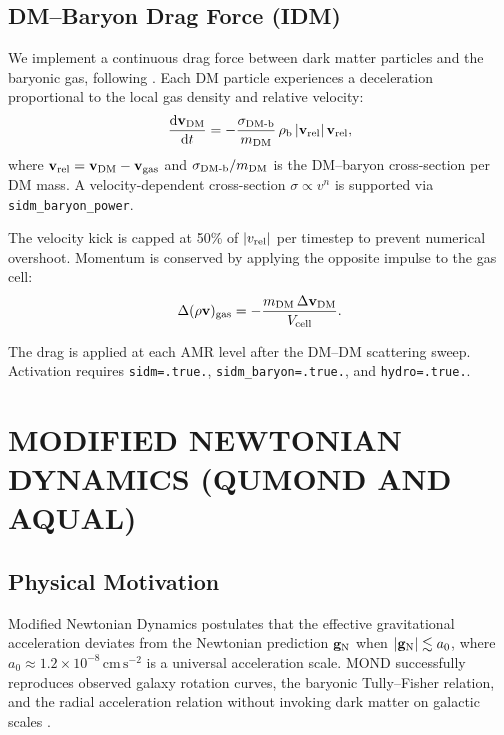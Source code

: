 \documentclass[fleqn,usenatbib]{mnras}
\newcommand{\code}[1]{\texttt{#1}}
\newcommand{\vrel}{v_{\rm rel}}
\newcommand{\azero}{a_0}
\newcommand{\gN}{\mathbf{g}_{\rm N}}
\begin{document}
\subsection{DM--Baryon Drag Force (IDM)}
\label{sec:sidm_baryon}

We implement a continuous drag force between dark matter particles and
the baryonic gas, following \citet{Nguyen2025}.  Each DM particle
experiences a deceleration proportional to the local gas density and
relative velocity:
\begin{equation}
\frac{\mathrm{d}\mathbf{v}_{\rm DM}}{\mathrm{d}t}
= -\frac{\sigma_{\rm DM\text{-}b}}{m_{\rm DM}}
  \,\rho_{\rm b}\,|\mathbf{v}_{\rm rel}|\,\mathbf{v}_{\rm rel},
\label{eq:idm_drag}
\end{equation}
where $\mathbf{v}_{\rm rel} = \mathbf{v}_{\rm DM} -
\mathbf{v}_{\rm gas}$ and $\sigma_{\rm DM\text{-}b}/m_{\rm DM}$ is
the DM--baryon cross-section per DM mass.  A velocity-dependent
cross-section $\sigma \propto v^n$ is supported via
\code{sidm\_baryon\_power}.

The velocity kick is capped at 50\% of $|\vrel|$ per timestep to
prevent numerical overshoot.  Momentum is conserved by applying the
opposite impulse to the gas cell:
\begin{equation}
\Delta(\rho\mathbf{v})_{\rm gas}
= -\frac{m_{\rm DM}\,\Delta\mathbf{v}_{\rm DM}}{V_{\rm cell}}.
\end{equation}

The drag is applied at each AMR level after the DM--DM scattering
sweep.  Activation requires \code{sidm=.true.},
\code{sidm\_baryon=.true.}, and \code{hydro=.true.}.

\section{MODIFIED NEWTONIAN DYNAMICS (QUMOND AND AQUAL)}
\label{sec:mond}

\subsection{Physical Motivation}
\label{sec:mond_motivation}

Modified Newtonian Dynamics \citep{Milgrom1983} postulates that the
effective gravitational acceleration deviates from the Newtonian
prediction $\gN$ when $|\gN| \lesssim \azero$, where $\azero \approx
1.2 \times 10^{-8}\,\mathrm{cm\,s^{-2}}$ is a universal acceleration
scale.  MOND successfully reproduces observed galaxy rotation curves,
the baryonic Tully--Fisher relation, and the radial acceleration
relation without invoking dark matter on galactic scales
\citep{Famaey2012,Milgrom2014,McGaugh2016}.
\end{document}
